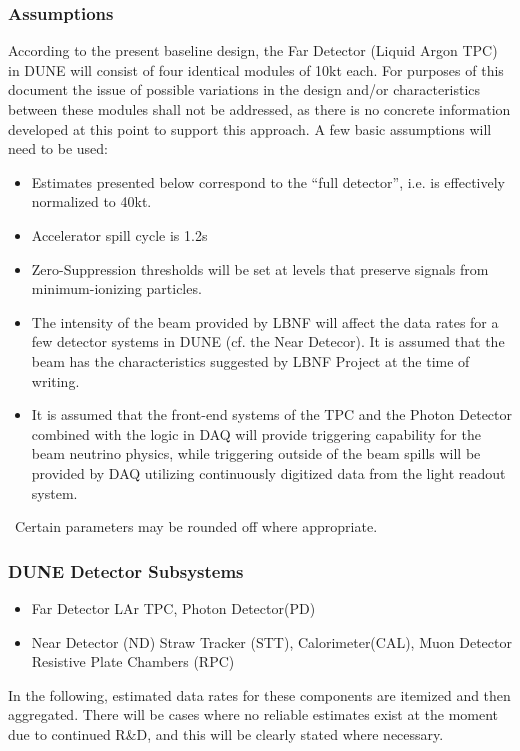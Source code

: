 \subsubsection{Assumptions}
\label{sec:detectors-sc-infrastructure-assumptions}
According to the present baseline design, the Far Detector (Liquid Argon TPC) in DUNE will consist
of four identical modules of 10kt each.
For purposes of this document the issue of possible variations in the design and/or characteristics
between these modules shall not be addressed, as there is no concrete information developed at
this point to support this approach. A few basic assumptions will need to be used:
\begin{itemize}
\item Estimates presented below correspond to the ``full detector'', i.e. is effectively
normalized to 40kt.
\item Accelerator spill cycle is 1.2s
\item Zero-Suppression thresholds will be set at levels that preserve signals from minimum-ionizing particles.
\item The intensity of the beam provided by LBNF will affect the data rates for a few detector
systems in DUNE (cf. the Near Detecor).
It is assumed that the beam has the characteristics suggested by LBNF Project at the time of writing.
\item It is assumed that the front-end systems of the TPC and the Photon Detector combined
with the logic in DAQ will provide triggering capability for the beam neutrino physics, while
triggering outside of the beam spills will be provided by DAQ utilizing continuously digitized
data from the light readout system.
\end{itemize}
\
Certain parameters may be rounded off where appropriate.

\subsubsection{DUNE Detector Subsystems}
\begin{itemize}
\item Far Detector LAr TPC, Photon Detector(PD)
\item Near Detector (ND) Straw Tracker (STT), Calorimeter(CAL), Muon Detector Resistive Plate Chambers (RPC)
\end{itemize}

In the following, estimated data rates for these components are itemized and then aggregated.
There will be cases where no reliable estimates exist at the moment due to continued R\&D, and this will
be clearly stated where necessary.

